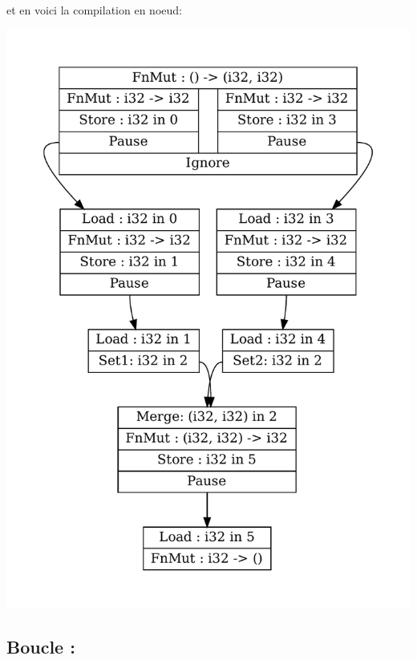 \documentclass[a4paper]{article}
\renewcommand{\(}{\left(}
\renewcommand{\)}{\right)}
\begin{document}
\pagebreak
et en voici la compilation en noeud:
\begin{center}
\includegraphics[scale=0.72]{parn.pdf}
\end{center}


\subsection{Boucle :}
\end{document}
